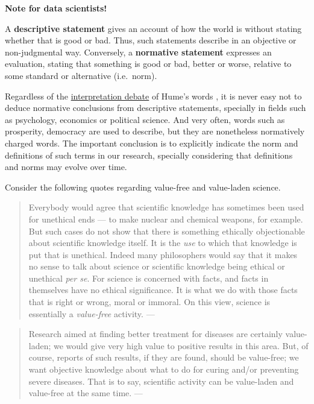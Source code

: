 \documentclass[
]{book}
\begin{document}
\begin{tipbox}

\textbf{Note for data scientists!}

A \textbf{descriptive statement} gives an account of how the world is without stating whether that is good or bad. Thus, such statements describe in an objective or non-judgmental way. Conversely, a \textbf{normative statement} expresses an evaluation, stating that something is good or bad, better or worse, relative to some standard or alternative (i.e.~norm).

\end{tipbox}

Regardless of the \href{https://plato.stanford.edu/entries/hume-moral/\#io}{interpretation debate} of Hume's words \citep{sep-hume-moral}, it is never easy not to deduce normative conclusions from descriptive statements, specially in fields such as psychology, economics or political science. And very often, words such as prosperity, democracy are used to describe, but they are nonetheless normatively charged words. The important conclusion is to explicitly indicate the norm and definitions of such terms in our research, specially considering that definitions and norms may evolve over time.

Consider the following quotes regarding value-free and value-laden science.

\begin{quote}
Everybody would agree that scientific knowledge has sometimes been used for unethical ends --- to make nuclear and chemical weapons, for example. But such cases do not show that there is something ethically objectionable about scientific knowledge itself. It is the \emph{use} to which that knowledge is put that is unethical. Indeed many philosophers would say that it makes no sense to talk about science or scientific knowledge being ethical or unethical \emph{per se}. For science is concerned with facts, and facts in themselves have no ethical significance. It is what we do with those facts that is right or wrong, moral or immoral. On this view, science is essentially a \emph{value-free} activity. --- \citep{okasha-pos}
\end{quote}

\begin{quote}
Research aimed at finding better treatment for diseases are certainly value-laden; we would give very high value to positive results in this area. But, of course, reports of such results, if they are found, should be value-free; we want objective knowledge about what to do for curing and/or preventing severe diseases. That is to say, scientific activity can be value-laden and value-free at the same time. --- \citep{johansson2016philosophy}
\end{quote}
\end{document}
